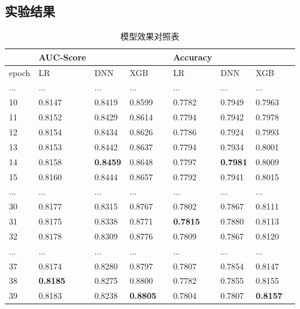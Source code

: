 \subsection{实验结果}
\begin{table}[htp]
    \centering\small
    \caption{模型效果对照表}
    \begin{tabular}{lllllllll}
    \toprule
     & AUC-Score              &              &              &  & Accuracy              &              &             &  \\
    \midrule
    epoch & LR              & DNN             & XGB             &  & LR              & DNN             & XGB             &  \\
    ... & ...             & ...             & ...             &     & ...             & ...             & ...             &  \\
    10  & 0.8147          & 0.8419          & 0.8599          &     & 0.7782          & 0.7949          & 0.7963          &  \\
    11  & 0.8152          & 0.8429          & 0.8614          &     & 0.7794          & 0.7942          & 0.7978          &  \\
    12  & 0.8154          & 0.8434          & 0.8626          &     & 0.7786          & 0.7924          & 0.7993          &  \\
    13  & 0.8153          & 0.8442          & 0.8637          &     & 0.7794          & 0.7934          & 0.8001          &  \\
    14  & 0.8158          & \textbf{0.8459} & 0.8648          &     & 0.7797          & \textbf{0.7981} & 0.8009          &  \\
    15  & 0.8160          & 0.8444          & 0.8657          &     & 0.7792          & 0.7941          & 0.8015          &  \\
    ... & ...             & ...             & ...             &     & ...             & ...             & ...             &  \\
    30  & 0.8177          & 0.8315          & 0.8767          &     & 0.7802          & 0.7867          & 0.8111          &  \\
    31  & 0.8175          & 0.8338          & 0.8771          &     & \textbf{0.7815} & 0.7880          & 0.8113          &  \\
    32  & 0.8178          & 0.8309          & 0.8776          &     & 0.7809          & 0.7867          & 0.8120          &  \\
    ... & ...             & ...             & ...             &     & ...             & ...             & ...             &  \\   
    37  & 0.8174          & 0.8280          & 0.8797          &     & 0.7807          & 0.7854          & 0.8147          &  \\
    38  & \textbf{0.8185} & 0.8275          & 0.8800          &     & 0.7782          & 0.7855          & 0.8155          &  \\
    39  & 0.8183          & 0.8238          & \textbf{0.8805} &     & 0.7804          & 0.7807          & \textbf{0.8157} &  \\
    \bottomrule
    \end{tabular}
\end{table}

